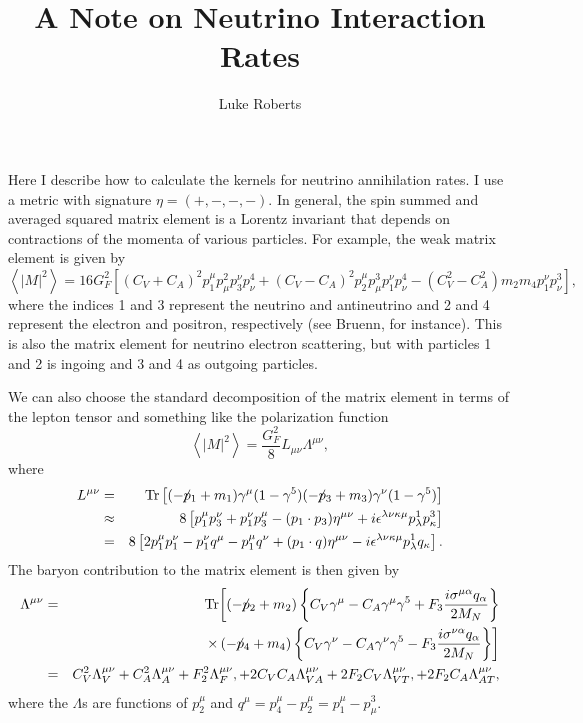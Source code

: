 \documentclass[12pt,letter]{article}
\title{A Note on Neutrino Interaction Rates}
\author{Luke Roberts}
\date{} %
\newcommand{\fsl}[1]{\ensuremath{\mathrlap{\!\not{\phantom{#1}}}#1}}
\begin{document}
\maketitle

Here I describe how to calculate the kernels for neutrino annihilation rates.  I use a metric with signature $\eta = (+,-,-,-)$.  In general, the spin summed and averaged squared matrix element is a Lorentz invariant that depends on contractions of the momenta of various particles.  For example, the weak matrix element is given by  
\begin{equation*}
\left\langle \left| M \right|^2 \right \rangle = 16 G_F^2 \left [ 
(C_V + C_A)^2 p^\mu_1 p_\mu^2 p^\nu_3 p_\nu^4
+(C_V - C_A)^2 p^\mu_2 p_\mu^3 p^\nu_1 p_\nu^4
-(C_V^2 - C_A^2) m_2 m_4 p^\nu_1 p_\nu^3
\right],
\end{equation*}
where the indices 1 and 3 represent the neutrino and antineutrino and 2 and 4 represent the electron and positron, respectively (see Bruenn, for instance).  This is also the matrix element for neutrino electron scattering, but with particles 1 and 2 is ingoing and 3 and 4 as outgoing particles.

We can also choose the standard decomposition of the matrix element in terms of the lepton tensor and something like the polarization function 
\begin{equation*}
\left\langle \left| M \right|^2 \right \rangle = \frac{G_F^2}{8}
L_{\mu \nu} \Lambda^{\mu \nu},
\end{equation*}
where 
\begin{eqnarray*}
L^{\mu \nu} &=& \textrm{Tr}\left[
(-\fsl{p}_1 + m_1) \gamma^\mu(1-\gamma^5) 
(-\fsl{p}_3 + m_3) \gamma^\nu(1-\gamma^5)  
\right] \\
&\approx& 8 \left[p_1^\mu p_3^\nu + p_1^\nu p_3^\mu 
- (p_1 \cdot p_3) \eta^{\mu \nu}   
+ i \epsilon^{\lambda \nu \kappa \mu} p_\lambda^1 p_\kappa^3
\right] \\
&=& 8 \left[2p_1^\mu p_1^\nu - p_1^\nu q^\mu - p_1^\mu q^\nu 
+ (p_1 \cdot q) \eta^{\mu \nu}   
- i \epsilon^{\lambda \nu \kappa \mu} p_\lambda^1 q_\kappa
\right].
\end{eqnarray*}
The baryon contribution to the matrix 
element is then given by 
\begin{eqnarray*}
\Lambda^{\mu \nu} &=& \textrm{Tr}\biggl[
(-\fsl{p}_2 + m_2) 
\left\{ C_V\gamma^\mu -C_A\gamma^\mu \gamma^5 
+ F_3\frac{i \sigma^{\mu \alpha}q_\alpha}{2 M_N} \right\}
\nonumber\\
&& \times \, (-\fsl{p}_4 + m_4)
\left \{ C_V\gamma^\nu -C_A\gamma^\nu \gamma^5 
- F_3\frac{i \sigma^{\nu \alpha}q_\alpha}{2 M_N} \right\}
\biggr] \\
&=& C_V^2 \Lambda^{\mu \nu}_V 
+ C_A^2 \Lambda^{\mu \nu}_A 
+ F_2^2 \Lambda^{\mu \nu}_F,
+ 2 C_V C_A \Lambda^{\mu \nu}_{VA} 
+ 2 F_2 C_V \Lambda^{\mu \nu}_{VT}, 
+ 2 F_2 C_A \Lambda^{\mu \nu}_{AT},
\end{eqnarray*}
where the $\Lambda$s are functions of $p_2^\mu$ and $q^\mu = p_4^\mu - p_2^\mu = 
p_1^\mu - p^3_\mu$.
\end{document}
